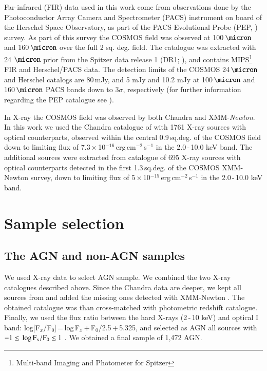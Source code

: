 \documentclass[fleqn,usenatbib]{mnras}
\begin{document}
Far-infrared (FIR) data used in this work come from observations done by the Photoconductor Array Camera and Spectrometer (PACS) instrument \citep{Poglitsch} on board of the Herschel Space Observatory, as part of the PACS Evolutional Probe (PEP, \citet{Lutz}) survey. As part of this survey the COSMOS field was observed at 100\,$\micron$ and 160\,$\micron$ over the full 2 sq. deg. field. The catalogue was extracted with 24 $\micron$ prior from the Spitzer data release 1 (DR1; \citet{Rieke}), and contains MIPS\footnote{Multi-band Imaging and Photometer for Spitzer} FIR and Herschel/PACS data. The detection limits of the COSMOS 24\,$\micron$ and Herschel catalogs are 80\,mJy, and 5 mJy and 10.2 mJy at 100\,$\micron$ and 160\,$\micron$ PACS bands down to 3$\sigma$, respectively (for further information regarding the PEP catalogue see \citet{Lutz}).

In X-ray the COSMOS field was observed by both Chandra and XMM-\textit{Newton}. In this work we used the Chandra catalogue of \cite{Civano2012} with 1761 X-ray sources with optical counterparts, observed within the central 0.9\,sq.deg. of the COSMOS field down to limiting flux of 7.3\,$\times$\,10$^{−16}$\,erg\,cm$^{−2}$\,s$^{−1}$ in the 2.0\,-\,10.0 keV band. The additional sources were extracted from \citet{Brusa2007} catalogue of 695 X-ray sources with optical counterparts detected in the first 1.3\,sq.deg. of the COSMOS XMM-Newton survey, down to limiting flux of 5\,$\times$\,10$^{−15}$\,erg\,cm$^{−2}$\,s$^{−1}$ in the 2.0\,-\,10.0 keV band.


\section{Sample selection}

\subsection{The AGN and non-AGN samples}
We used X-ray data to select AGN sample. We combined the two X-ray catalogues described above. Since the Chandra data are deeper, we kept all sources from \cite{Civano2012} and added the missing ones detected with XMM-Newton \citet{Brusa2007}. The obtained catalogue was than cross-matched with \citet{Salvato} photometric redshift catalogue. Finally, we used the flux ratio between the hard X-rays (2\,-\,10 keV) and optical I band: log[F$_{x}$/F$_{0}$]\,=\,log\,F$_{x}$\,+\,F$_{0}$/2.5\,+\,5.325, 
and selected as AGN all sources with $\rm{-1\leq\,log\,F_{x}/F_{0}\leq1}$ \citep{Alexander, Bauer, Bundy, Trump}. We obtained a final sample of 1,472 AGN.
\end{document}

